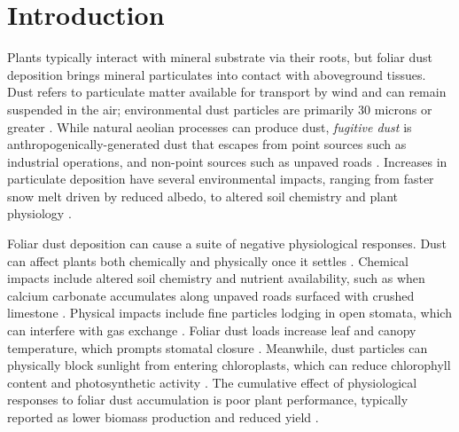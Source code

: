\documentclass{svjour3}
\begin{document}
\section{Introduction}

Plants typically interact with mineral substrate via their roots, but foliar dust deposition brings mineral particulates into contact with aboveground tissues. 
Dust refers to particulate matter available for transport by wind and can remain suspended in the air; environmental dust particles are primarily 30 microns or greater \citep{fairweather1965}. 
While natural aeolian processes can produce dust, \emph{fugitive dust} is anthropogenically-generated dust that escapes from point sources such as industrial operations, and non-point sources such as unpaved roads \citep{ulrichs2008}.
Increases in particulate deposition have several environmental impacts, ranging from faster snow melt driven by reduced albedo, to altered soil chemistry and plant physiology \citep{farmer1993, organiscak2004, painter2010}.

Foliar dust deposition can cause a suite of negative physiological responses.   
Dust can affect plants both chemically and physically once it settles \citep{farmer1993,ulrichs2008}.
Chemical impacts include altered soil chemistry and nutrient availability, such as when calcium carbonate accumulates along unpaved roads surfaced with crushed limestone \citep{organiscak2004}. 
Physical impacts include fine particles lodging in open stomata, which can interfere with gas exchange \citep{sharifi1997}.  
Foliar dust loads increase leaf and canopy temperature, which prompts stomatal closure \citep{eller1977, zia-khan2014}. 
Meanwhile, dust particles can physically block sunlight from entering chloroplasts, which can reduce chlorophyll content and photosynthetic activity \citep{thompson1984,fischer1998, chaurasia2013, bao2015,sarma2017}. 
The cumulative effect of physiological responses to foliar dust accumulation is poor plant performance, typically reported as lower biomass production and reduced yield \citep{fischer1998, zia-khan2014,sarma2017}. 
\end{document}
